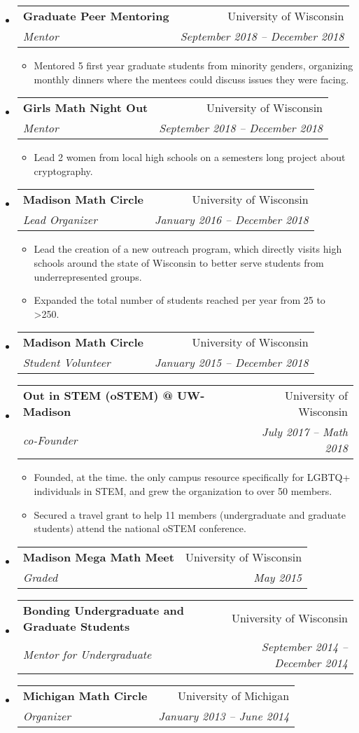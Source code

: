 \documentclass[letterpaper,11pt]{article}
\makeatletter
\newcommand{\resitem}[1]{\item #1 \vspace{-2pt}}
\newcommand{\ressubheading}[4]{
\begin{tabular*}{6.5in}[t]{l@{\cftdotfill{\cftsecdotsep}\extracolsep{\fill}}r}
		\textbf{#1} & #2 \\
		\textit{#3} & \textit{#4} \\
\end{tabular*}\vspace{-6pt}}
\makeatother
\begin{document}
\begin{itemize}
\item 
	\ressubheading{Graduate Peer Mentoring}{University of Wisconsin}{Mentor}{September 2018 -- December 2018}
	\begin{itemize}
		\resitem{Mentored 5 first year graduate students from minority genders, organizing monthly dinners where the mentees could discuss issues they were facing.}
	\end{itemize}
		
\item 
	\ressubheading{Girls Math Night Out}{University of Wisconsin}{Mentor}{September 2018 -- December 2018}
	\begin{itemize}
		\resitem{Lead 2 women from local high schools on a semesters long project about cryptography.}
	\end{itemize}

\item 
	\ressubheading{Madison Math Circle}{University of Wisconsin}{Lead Organizer}{January 2016 -- December 2018}
	\begin{itemize}
		\resitem{Lead the creation of a new outreach program, which directly visits high schools around the state of Wisconsin to better serve students from underrepresented groups.}
		\resitem{Expanded the total number of students reached per year from 25 to >250.}
	\end{itemize}

\item 
	\ressubheading{Madison Math Circle}{University of Wisconsin}{Student Volunteer}{January 2015 -- December 2018}
	
\item 
	\ressubheading{Out in STEM (oSTEM) @ UW-Madison}{University of Wisconsin}{co-Founder}{July 2017 -- Math 2018}
	\begin{itemize}
		\resitem{Founded, at the time. the only campus resource specifically for LGBTQ+ individuals in STEM, and grew the organization to over 50 members.}
		\resitem{Secured a travel grant to help 11 members (undergraduate and graduate students) attend the national oSTEM conference.}
		\end{itemize}

%	
\item 
	\ressubheading{Madison Mega Math Meet}{University of Wisconsin}{Graded}{May 2015}
	
\item 
	\ressubheading{Bonding Undergraduate and Graduate Students}{University of Wisconsin}{Mentor for Undergraduate}{September 2014 -- December 2014}

\item 
	\ressubheading{Michigan Math Circle}{University of Michigan}{Organizer}{January 2013 -- June 2014}
	

\end{itemize}
\end{document}

